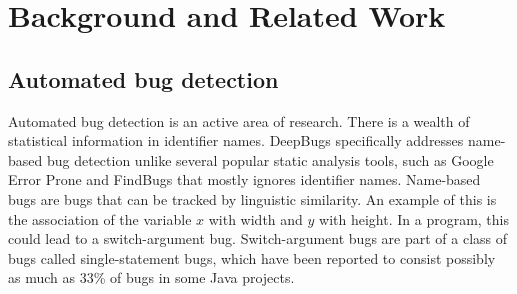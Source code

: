 \section{Background and Related Work}
\label{sec:background_and_related_work}
















\subsection{Automated bug detection}
\label{subsec:deepbugs_related_work}
Automated bug detection is an active area of research. There is a wealth of statistical information in identifier names. \cite{liu_nomen_2016} DeepBugs specifically addresses name-based bug detection unlike several popular static analysis tools, such as Google Error Prone \cite{aftandilian_building_2012} and FindBugs \cite{hovemeyer_evaluating_2005} that mostly ignores identifier names. Name-based bugs are bugs that can be tracked by linguistic similarity. An example of this is the association of the variable $x$ with width and $y$ with height. In a program, this could lead to a switch-argument bug. Switch-argument bugs are part of a class of bugs called single-statement bugs, which have been reported to consist possibly as much as 33\% of bugs in some Java projects. \cite{karampatsis_how_2020}

